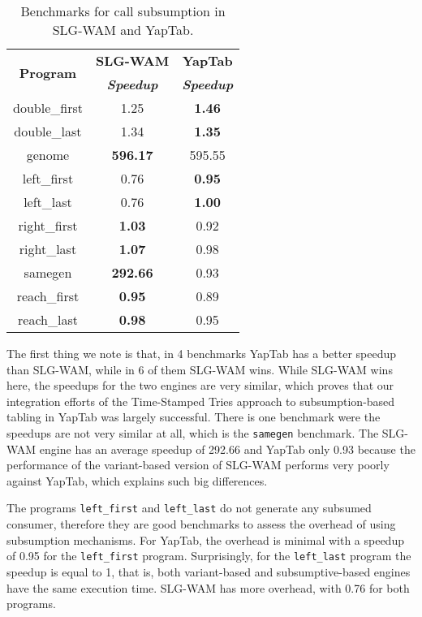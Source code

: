 \begin{table}[ht]
\centering
  \begin{tabular}{ccc}
   \hline
    \hline
    \multirow{2}{*}{\textbf{Program}} & \textbf{SLG-WAM} & \textbf{YapTab} \\
    & \textbf{\textit{\small{Speedup}}} & \textbf{\textit{\small{Speedup}}} \\
   \hline
   \hline
double\_first & 1.25 & \textbf{1.46} \\
double\_last & 1.34 & \textbf{1.35} \\
genome & \textbf{596.17} & 595.55 \\
left\_first & 0.76 & \textbf{0.95} \\
left\_last & 0.76  & \textbf{1.00} \\
right\_first & \textbf{1.03} & 0.92 \\
right\_last & \textbf{1.07} & 0.98 \\
samegen & \textbf{292.66} & 0.93 \\
reach\_first  & \textbf{0.95} & 0.89 \\
reach\_last  & \textbf{0.98} & 0.95 \\
\hline
\hline
\end{tabular}
\caption{Benchmarks for call subsumption in SLG-WAM and YapTab.}
\label{tbl:results_overview}
\end{table}

The first thing we note is that, in 4 benchmarks
YapTab has a better speedup than SLG-WAM, while in 6 of them SLG-WAM wins. While SLG-WAM wins here,
the speedups for the two engines are very similar, which proves that our integration
efforts of the Time-Stamped Tries approach to subsumption-based tabling in YapTab was largely successful.
There is one benchmark were the speedups are not very similar at all, which is the \texttt{samegen} benchmark.
The SLG-WAM engine has an average speedup of 292.66 and YapTab only 0.93 because the performance
of the variant-based version of SLG-WAM performs very poorly against YapTab, which explains such big differences.

The programs \texttt{left\_first} and \texttt{left\_last} do not generate any subsumed consumer,
therefore they are good benchmarks to assess the overhead of using subsumption mechanisms. For YapTab,
the overhead is minimal with a speedup of 0.95 for the \texttt{left\_first} program. Surprisingly, for the
\texttt{left\_last} program the speedup is equal to 1, that is, both variant-based and subsumptive-based
engines have the same execution time. SLG-WAM has more overhead, with 0.76 for both programs.

